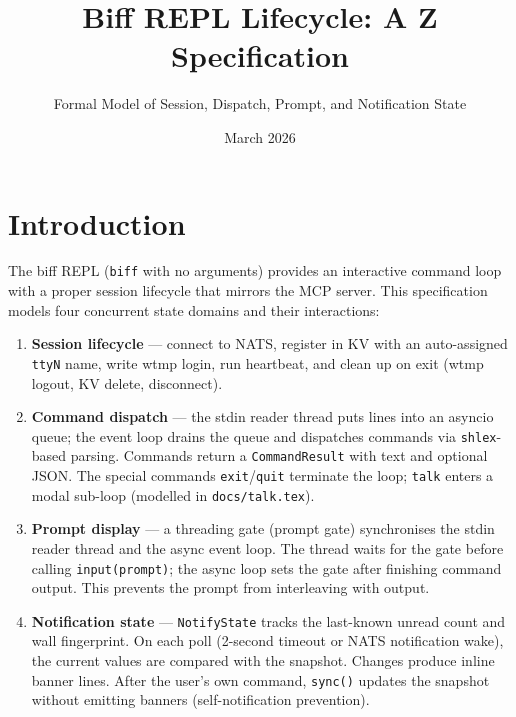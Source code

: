 \documentclass[a4paper,10pt,fleqn]{article}
\begin{document}
\title{Biff REPL Lifecycle: A Z Specification}
\author{Formal Model of Session, Dispatch, Prompt, and Notification State}
\date{March 2026}
\maketitle

\tableofcontents
\newpage

\section{Introduction}

The biff REPL (\texttt{biff} with no arguments) provides an interactive
command loop with a proper session lifecycle that mirrors the MCP
server.  This specification models four concurrent state domains and
their interactions:

\begin{enumerate}
\item \textbf{Session lifecycle} --- connect to NATS, register in KV
  with an auto-assigned \texttt{ttyN} name, write wtmp login, run
  heartbeat, and clean up on exit (wtmp logout, KV delete, disconnect).

\item \textbf{Command dispatch} --- the stdin reader thread puts lines
  into an asyncio queue; the event loop drains the queue and dispatches
  commands via \texttt{shlex}-based parsing.  Commands return a
  \texttt{CommandResult} with text and optional JSON.  The special
  commands \texttt{exit}/\texttt{quit} terminate the loop; \texttt{talk}
  enters a modal sub-loop (modelled in \texttt{docs/talk.tex}).

\item \textbf{Prompt display} --- a threading gate (prompt gate)
  synchronises the stdin reader thread and the async event loop.
  The thread waits for the gate before calling \texttt{input(prompt)};
  the async loop sets the gate after finishing command output.  This
  prevents the prompt from interleaving with output.

\item \textbf{Notification state} --- \texttt{NotifyState} tracks the
  last-known unread count and wall fingerprint.  On each poll (2-second
  timeout or NATS notification wake), the current values are compared
  with the snapshot.  Changes produce inline banner lines.  After the
  user's own command, \texttt{sync()} updates the snapshot without
  emitting banners (self-notification prevention).
\end{enumerate}
\end{document}
